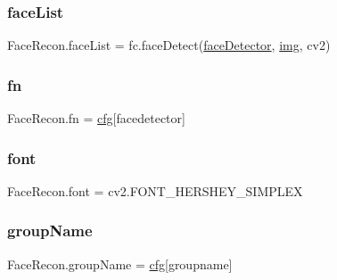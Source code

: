 \subsubsection{\texorpdfstring{face\+List}{faceList}}
{\footnotesize\ttfamily Face\+Recon.\+face\+List = fc.\+face\+Detect(\mbox{\hyperlink{namespace_face_recon_a52d7b32070be8a278850cdb6afd2d301}{face\+Detector}}, \mbox{\hyperlink{namespace_face_recon_a65dbfeade36a516a4fbd5cd1c44c5682}{img}}, cv2)}

\mbox{\label{namespace_face_recon_aaadefd1ee1352d2f1b2fdf3ea4db8390}} 
\subsubsection{\texorpdfstring{fn}{fn}}
{\footnotesize\ttfamily Face\+Recon.\+fn = \mbox{\hyperlink{namespace_face_recon_a6a0cb127a374ad0eb5705d0f49a40040}{cfg}}\mbox{[}\textquotesingle{}facedetector\textquotesingle{}\mbox{]}}

\mbox{\label{namespace_face_recon_aa83a22879c0d6299597d46b065e09c4c}} 
\subsubsection{\texorpdfstring{font}{font}}
{\footnotesize\ttfamily Face\+Recon.\+font = cv2.\+F\+O\+N\+T\+\_\+\+H\+E\+R\+S\+H\+E\+Y\+\_\+\+S\+I\+M\+P\+L\+EX}

\mbox{\label{namespace_face_recon_ae44f8e751a650fcfa6bc7d2a61242cc1}} 
\subsubsection{\texorpdfstring{group\+Name}{groupName}}
{\footnotesize\ttfamily Face\+Recon.\+group\+Name = \mbox{\hyperlink{namespace_face_recon_a6a0cb127a374ad0eb5705d0f49a40040}{cfg}}\mbox{[}\textquotesingle{}groupname\textquotesingle{}\mbox{]}}

\mbox{\label{namespace_face_recon_a65dbfeade36a516a4fbd5cd1c44c5682}} 
